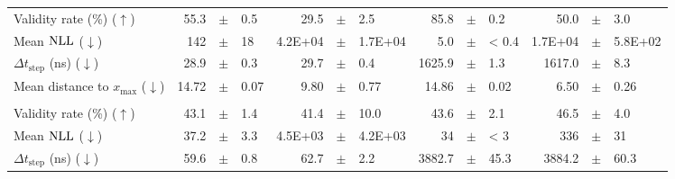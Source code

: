 \documentclass[../main.tex]{subfiles}
\begin{document}
\begin{adjustwidth}{-2.7in}{-3in}
\begin{center}
\begin{tabular}{lrllrllrllrll}
			\cmidrule(lr){2-13}
			Validity rate (\%) ($\uparrow$)                & 55.3                                       & $\pm$                                                             & 0.5                    & 29.5                    & $\pm$ & 2.5     & 85.8   & $\pm$ & 0.2   & 50.0    & $\pm$ & 3.0     \\
			Mean $\text{NLL}$ ($\downarrow$)                     & 142                                        & $\pm$                                                             & 18                     & 4.2E+04                 & $\pm$ & 1.7E+04 & 5.0    & $\pm$ & < 0.4 & 1.7E+04 & $\pm$ & 5.8E+02 \\
			$\Delta t_\text{step}$ (ns) ($\downarrow$)     & 28.9                                       & $\pm$                                                             & 0.3                    & 29.7                    & $\pm$ & 0.4     & 1625.9 & $\pm$ & 1.3   & 1617.0  & $\pm$ & 8.3     \\
			Mean distance to $x_\text{max}$ ($\downarrow$) & 14.72                                      & $\pm$                                                             & 0.07                   & 9.80                    & $\pm$ & 0.77    & 14.86  & $\pm$ & 0.02  & 6.50    & $\pm$ & 0.26    \\
			\midrule
			                                               & \multicolumn{12}{c}{\OnlineNewsPopularity}                                                                                                                                                                                               \\
			\cmidrule(lr){2-13}
			Validity rate (\%) ($\uparrow$)                & 43.1                                       & $\pm$                                                             & 1.4                    & 41.4                    & $\pm$ & 10.0    & 43.6   & $\pm$ & 2.1   & 46.5    & $\pm$ & 4.0     \\
			Mean $\text{NLL}$ ($\downarrow$)                     & 37.2                                       & $\pm$                                                             & 3.3                    & 4.5E+03                 & $\pm$ & 4.2E+03 & 34     & $\pm$ & < 3   & 336     & $\pm$ & 31      \\
			$\Delta t_\text{step}$ (ns) ($\downarrow$)     & 59.6                                       & $\pm$                                                             & 0.8                    & 62.7                    & $\pm$ & 2.2     & 3882.7 & $\pm$ & 45.3  & 3884.2  & $\pm$ & 60.3    \\

\end{tabular}
\end{center}
\end{adjustwidth}
\end{document}
